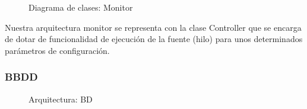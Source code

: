\begin{figure}[H]
  \caption{Diagrama de clases: Monitor}
\end{figure}

Nuestra arquitectura monitor se representa con la clase Controller que se encarga de dotar de funcionalidad de ejecución de la fuente (hilo) para unos determinados parámetros de configuración.

\subsubsection{BBDD}

\begin{figure}[H]
  \caption{Arquitectura: BD}
\end{figure}

